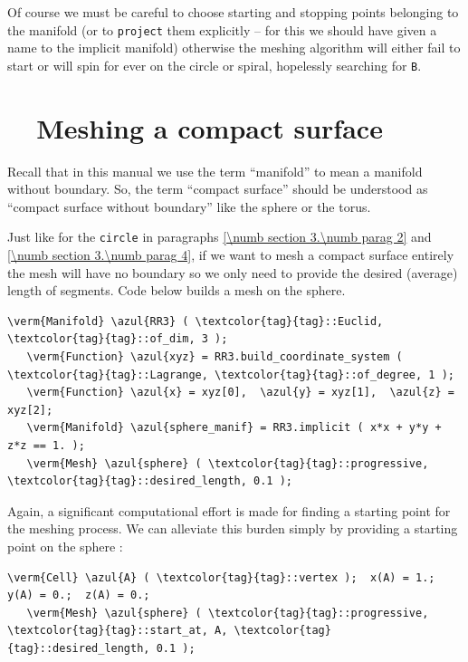 Of course we must be careful to choose starting and stopping points belonging to the manifold
(or to {\small\tt project} them explicitly -- for this we should have given a name to the
implicit manifold) otherwise the meshing algorithm will either fail to start or will spin
for ever on the circle or spiral, hopelessly searching for {\small\tt B}.


\section{~~Meshing a compact surface}\label{\numb section 3.\numb parag 6}

Recall that in this manual we use the term ``manifold'' to mean a manifold without boundary.
So, the term ``compact surface'' should be understood as ``compact surface without boundary''
like the sphere or the torus.

Just like for the {\small\tt circle} in paragraphs \ref{\numb section 3.\numb parag 2} and
\ref{\numb section 3.\numb parag 4}, if we want to mesh a compact surface entirely
the mesh will have no boundary so we only need to provide the desired (average) length
of segments.
Code below builds a mesh on the sphere.

\begin{Verbatim}[commandchars=\\\{\},formatcom=\small\tt,frame=single,
   label=parag-\ref{\numb section 3.\numb parag 6}.cpp,rulecolor=\color{coment},
   baselinestretch=0.94,framesep=2mm                                            ]
   \verm{Manifold} \azul{RR3} ( \textcolor{tag}{tag}::Euclid, \textcolor{tag}{tag}::of_dim, 3 );
   \verm{Function} \azul{xyz} = RR3.build_coordinate_system ( \textcolor{tag}{tag}::Lagrange, \textcolor{tag}{tag}::of_degree, 1 );
   \verm{Function} \azul{x} = xyz[0],  \azul{y} = xyz[1],  \azul{z} = xyz[2];
   \verm{Manifold} \azul{sphere_manif} = RR3.implicit ( x*x + y*y + z*z == 1. );
   \verm{Mesh} \azul{sphere} ( \textcolor{tag}{tag}::progressive, \textcolor{tag}{tag}::desired_length, 0.1 );
\end{Verbatim}

Again, a significant computational effort is made for finding a starting point
for the meshing process.
We can alleviate this burden simply by providing a starting point on the sphere :

\begin{Verbatim}[commandchars=\\\{\},formatcom=\small\tt,
   baselinestretch=0.94,framesep=2mm                     ]
   \verm{Cell} \azul{A} ( \textcolor{tag}{tag}::vertex );  x(A) = 1.;  y(A) = 0.;  z(A) = 0.;
   \verm{Mesh} \azul{sphere} ( \textcolor{tag}{tag}::progressive, \textcolor{tag}{tag}::start_at, A, \textcolor{tag}{tag}::desired_length, 0.1 );
\end{Verbatim}

